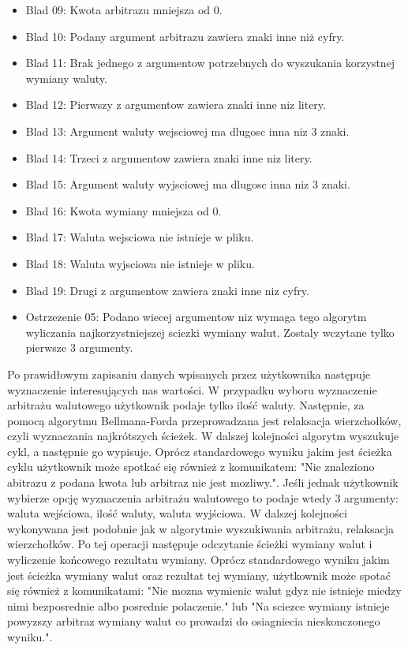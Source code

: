 \documentclass[12pt]{article}
\begin{document}
\begin{itemize}
\item Blad 09: Kwota arbitrazu mniejsza od 0.
\item Blad 10: Podany argument arbitrazu zawiera znaki inne niż cyfry.
\item Blad 11: Brak jednego z argumentow potrzebnych do wyszukania korzystnej wymiany waluty.
\item Blad 12: Pierwszy z argumentow zawiera znaki inne niz litery.
\item Blad 13: Argument waluty wejsciowej ma dlugosc inna niz 3 znaki.
\item Blad 14: Trzeci z argumentow zawiera znaki inne niz litery.
\item Blad 15: Argument waluty wyjsciowej ma dlugosc inna niz 3 znaki.
\item Blad 16: Kwota wymiany mniejsza od 0.
\item Blad 17: Waluta wejsciowa nie istnieje w pliku.
\item Blad 18: Waluta wyjsciowa nie istnieje w pliku.
\item Blad 19: Drugi z argumentow zawiera znaki inne niz cyfry.
\item Ostrzezenie 05: Podano wiecej argumentow niz wymaga tego algorytm wyliczania najkorzystniejszej sciezki wymiany walut. Zostaly wczytane tylko pierwsze 3 argumenty.
\end{itemize}

Po prawidłowym zapisaniu danych wpisanych przez użytkownika następuje wyznaczenie interesujących nas wartości.
\newline\newline
W przypadku wyboru wyznaczenie arbitrażu walutowego użytkownik podaje tylko ilość waluty. Następnie, za pomocą algorytmu Bellmana-Forda przeprowadzana jest relaksacja wierzchołków, czyli wyznaczania najkrótszych ścieżek. W dalszej kolejności algorytm wyszukuje cykl, a następnie go wypisuje. Oprócz standardowego wyniku jakim jest ścieżka cyklu użytkownik może spotkać się również z komunikatem: "Nie znaleziono abitrazu z podana kwota lub arbitraz nie jest mozliwy.".
\newline\newline
Jeśli jednak użytkownik wybierze opcję wyznaczenia arbitrażu walutowego to podaje wtedy 3 argumenty: waluta wejściowa, ilość waluty, waluta wyjściowa. W dalszej kolejności wykonywana jest podobnie jak w algorytmie wyszukiwania arbitrażu, relaksacja wierzchołków. Po tej operacji następuje odczytanie ścieżki wymiany walut i wyliczenie końcowego rezultatu wymiany. Oprócz standardowego wyniku jakim jest ścieżka wymiany walut oraz rezultat tej wymiany, użytkownik może spotać się również z komunikatami: "Nie mozna wymienic walut gdyz nie istnieje miedzy nimi bezposrednie albo posrednie polaczenie." lub "Na sciezce wymiany istnieje powyzszy arbitraz wymiany walut co prowadzi do osiagniecia nieskonczonego wyniku.".
\end{document}

